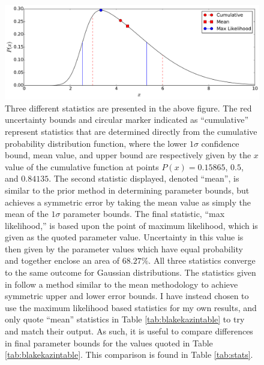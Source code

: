 \documentclass[titlesmallcaps, examinerscopy, copyrightpage]{uqthesis}
\begin{document}
\begin{figure}[h]
  \begin{center}
    \includegraphics[width=\textwidth]{images/stats.pdf}
  \end{center}
  \caption{Three different statistics are presented in the above figure. The red uncertainty bounds and circular marker indicated as ``cumulative'' represent statistics that are determined directly from the cumulative probability distribution function, where the lower $1\sigma$ confidence bound, mean value, and upper bound are respectively given by the $x$ value of the cumulative function at points $P(x) = 0.15865$, $0.5$, and $0.84135$. The second statistic displayed, denoted ``mean'', is similar to the prior method in determining parameter bounds, but achieves a symmetric error by taking the mean value as simply the mean of the $1\sigma$ parameter bounds. The final statistic, ``max likelihood,'' is based upon the point of maximum likelihood, which is given as the quoted parameter value. Uncertainty in this value is then given by the parameter values which have equal probability and together enclose an area of $68.27\%$. All three statistics converge to the same outcome for Gaussian distributions. The statistics given in \citet{BlakeKazin2011} follow a method similar to the mean methodology to achieve symmetric upper and lower error bounds. I have instead chosen to use the maximum likelihood based statistics for my own results, and only quote ``mean'' statistics in Table \ref{tab:blakekazintable} to try and match their output. As such, it is useful to compare differences in final parameter bounds for the values quoted in Table \ref{tab:blakekazintable}. This comparison is found in Table \ref{tab:stats}.}
  \label{fig:statistics}
\end{figure}
\end{document}

